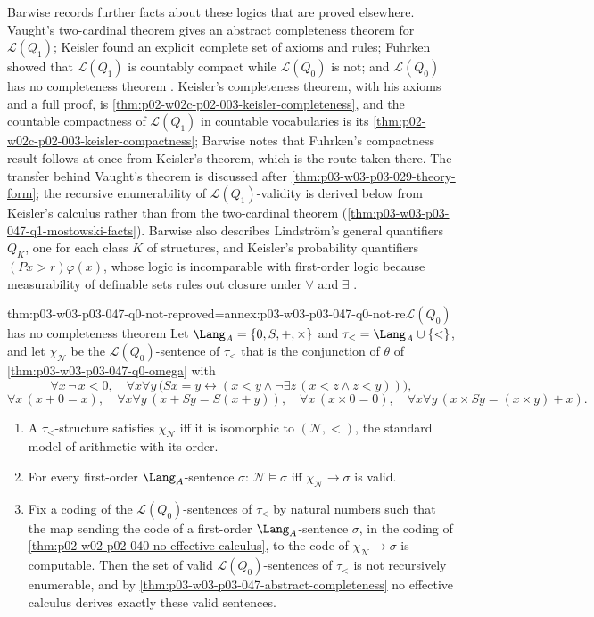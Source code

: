 Barwise records further facts about these logics that are proved elsewhere.
Vaught's two-cardinal theorem gives an abstract completeness theorem for
\(\mathscr L(Q_1)\); Keisler found an explicit complete set of axioms and
rules; Fuhrken showed that \(\mathscr L(Q_1)\) is countably compact while
\(\mathscr L(Q_0)\) is not; and \(\mathscr L(Q_0)\) has no completeness
theorem \cite[Ch.~I, \S1.5, pp.~8--9]{Barwise1985BackgroundAims}.  Keisler's
completeness theorem, with his axioms and a full proof, is
\cref{thm:p02-w02c-p02-003-keisler-completeness}, and the countable
compactness of \(\mathscr L(Q_1)\) in countable vocabularies is its
\cref{thm:p02-w02c-p02-003-keisler-compactness}; Barwise notes that
Fuhrken's compactness result follows at once from Keisler's theorem, which
is the route taken there.  The transfer behind Vaught's theorem is discussed
after \cref{thm:p03-w03-p03-029-theory-form}; the recursive enumerability of
\(\mathscr L(Q_1)\)-validity is derived below from Keisler's calculus rather
than from the two-cardinal theorem
(\cref{thm:p03-w03-p03-047-q1-mostowski-facts}).  Barwise also describes
Lindstr\"om's general quantifiers \(Q_K\), one for each class \(K\) of
structures, and Keisler's probability quantifiers \((Px>r)\varphi(x)\),
whose logic is incomparable with first-order logic because measurability of
definable sets rules out closure under \(\forall\) and \(\exists\)
\cite[Ch.~I, \S1.5, p.~9]{Barwise1985BackgroundAims}.

\begin{hbtheorem}{thm:p03-w03-p03-047-q0-not-re}{proved=annex:p03-w03-p03-047-q0-not-re}{\(\mathscr L(Q_0)\) has no completeness theorem}
Let \(\Lang_A=\{0,S,+,\times\}\) and \(\tau_<=\Lang_A\cup\{<\}\), and let
\(\chi_{\mathcal N}\) be the \(\mathscr L(Q_0)\)-sentence of \(\tau_<\) that
is the conjunction of \(\theta\) of \cref{thm:p03-w03-p03-047-q0-omega} with
\[
 \forall x\,\neg\,x<0,\quad
 \forall x\forall y\,\bigl(Sx=y\leftrightarrow(x<y\land\neg\exists z\,(x<z\land z<y))\bigr),
\]
\[
 \forall x\,(x+0=x),\quad \forall x\forall y\,(x+Sy=S(x+y)),\quad
 \forall x\,(x\times0=0),\quad \forall x\forall y\,(x\times Sy=(x\times y)+x).
\]
\begin{enumerate}
 \item A \(\tau_<\)-structure satisfies \(\chi_{\mathcal N}\) iff it is
       isomorphic to \((\mathcal N,<)\), the standard model of arithmetic
       with its order.
 \item For every first-order \(\Lang_A\)-sentence \(\sigma\):
       \(\mathcal N\models\sigma\) iff \(\chi_{\mathcal N}\to\sigma\) is valid.
 \item Fix a coding of the \(\mathscr L(Q_0)\)-sentences of \(\tau_<\) by
       natural numbers such that the map sending the code of a first-order
       \(\Lang_A\)-sentence \(\sigma\), in the coding of
       \cref{thm:p02-w02-p02-040-no-effective-calculus}, to the code of
       \(\chi_{\mathcal N}\to\sigma\) is computable.  Then the set of valid
       \(\mathscr L(Q_0)\)-sentences of \(\tau_<\) is not recursively
       enumerable, and by \cref{thm:p03-w03-p03-047-abstract-completeness}
       no effective calculus derives exactly these valid sentences.
\end{enumerate}
\end{hbtheorem}

